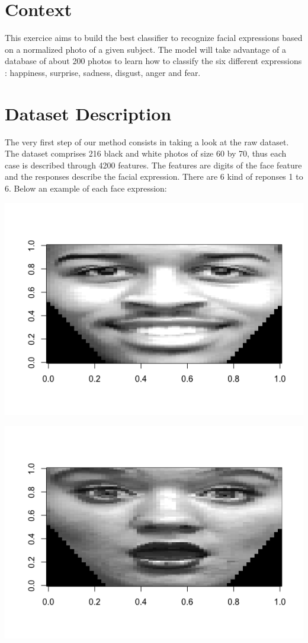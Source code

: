 \documentclass[]{report}
\begin{document}
\tableofcontents



\section{Context}
This exercice aims to build the best classifier to recognize facial expressions based on a normalized photo of a given subject. The model will take advantage of a database of about 200 photos to learn how to classify the six different expressions : happiness, surprise, sadness, disgust, anger and fear.

\section{Dataset Description}
The very first step of our method consists in taking a look at the raw dataset. The dataset comprises 216 black and white photos of size 60 by 70, thus each case is described through 4200 features. The features are digits of the face feature and the responses describe the facial expression. There are 6 kind of reponses 1 to 6. Below an example of each face expression:

\begin{center}
	\includegraphics[width=0.8\linewidth]{Figures/happy_X32_y1.png}
	\label{fig:y=1}
\end{center}

\begin{center}
	\includegraphics[width=0.8\linewidth]{Figures/shocked_X8_y2.png}
	\label{fig:y=2}
\end{center}
\end{document}
